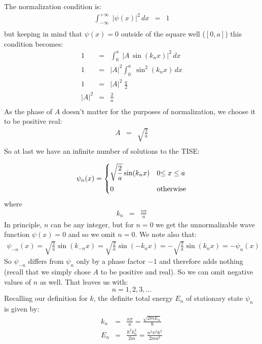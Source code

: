 \documentclass[12pt]{book}
\begin{document}
The normalization condition is:
\begin{eqnarray*}
\int_{-\infty}^{+\infty} \; |\psi(x)|^2 \, dx &=& 1 \\
\end{eqnarray*}
but keeping in mind that $\psi(x)=0$ outside of the square well ($[0,a]$) this condition becomes:
\begin{eqnarray*}
1 &=& \int_{0}^{a} \; |A \, \sin(k_n x)|^2 \, dx \\
1 &=& |A|^2 \int_{0}^{a} \; \sin^2(k_n x) \, dx \\
1 &=& |A|^2 \; \frac{a}{2} \\
|A|^2 &=& \frac{2}{a} \\
\end{eqnarray*}
As the phase of $A$ doesn't matter for the purposes of normalization, we choose it to be positive real:
\begin{eqnarray*}
A &=& \sqrt{\frac{2}{a}} \\
\end{eqnarray*}
So at last we have an infinite number of solutions to the TISE:

\begin{equation}
\label{eqn:psin-isw}
\psi_n(x) = 
\begin{cases}    
   {\displaystyle \sqrt{\frac{2}{a}}\sin(k_n x)} & 0 {\displaystyle \leq x \leq a} \\[8pt]
   0 & {\rm otherwise} \\
\end{cases}   
\end{equation}
where
\begin{eqnarray*}
k_n&=&\frac{n\pi}{a}
\end{eqnarray*}
In principle, $n$ can be any integer, but for $n=0$ we get the unnormalizable wave function $\psi(x)=0$ and so we omit $n=0$.  We note also that:
\begin{eqnarray*}
\psi_{-n}(x) = \sqrt{\frac{2}{a}} \sin(k_{-n}x) = \sqrt{\frac{2}{a}} \sin(-k_{n}x) = -\sqrt{\frac{2}{a}} \sin(k_{n}x) = -\psi_{n}(x)
\end{eqnarray*}
So $\psi_{-n}$ differs from $\psi_{n}$ only by a phase factor $-1$ and therefore adds nothing (recall that we simply chose $A$ to be positive and real).  So we can omit negative values of $n$ as well.  That leaves us with:
\begin{equation*}
n = 1,2,3,\ldots
\end{equation*}
Recalling our definition for $k$, the definite total energy $E_n$ of stationary state $\psi_n$ is given by:
\begin{eqnarray}
k_n &=& \frac{n\pi}{a} = \frac{\sqrt{2mE_n}}{\hbar}\\[10pt]
E_n &=& \frac{\hbar^2k_n^2}{2m}= \frac{n^2 \pi^2 \hbar^2}{2ma^2}
\end{eqnarray}
\end{document}
